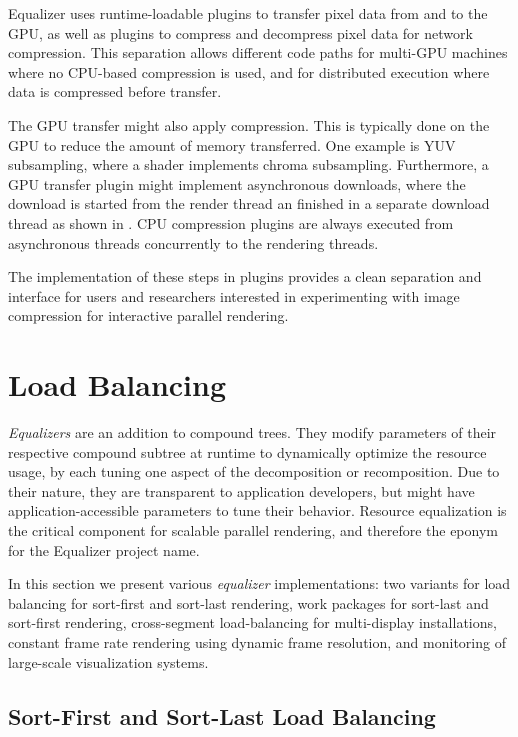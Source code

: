 Equalizer uses runtime-loadable plugins to transfer pixel data from and to the
GPU, as well as plugins to compress and decompress pixel data for network
compression. This separation allows different code paths for multi-GPU machines
where no CPU-based compression is used, and for distributed execution where data
is compressed before transfer.

The GPU transfer might also apply compression. This is typically done on the GPU
to reduce the amount of memory transferred. One example is YUV subsampling,
where a shader implements chroma subsampling. Furthermore, a GPU transfer plugin
might implement asynchronous downloads, where the download is started from the
render thread an finished in a separate download thread as shown in
. CPU compression plugins are always executed from asynchronous
threads concurrently to the rendering threads.

The implementation of these steps in plugins provides a clean separation and
interface for users and researchers interested in experimenting with image
compression for interactive parallel rendering.


\chapter{Load Balancing}\label{sLoadBalancing}

{\em Equalizers} are an addition to compound trees. They modify parameters of
their respective compound subtree at runtime to dynamically optimize the
resource usage, by each tuning one aspect of the decomposition or recomposition.
Due to their nature, they are transparent to application developers, but might
have application-accessible parameters to tune their behavior. Resource
equalization is the critical component for scalable parallel rendering, and
therefore the eponym for the \textsf{Equalizer} project name.

In this section we present various {\em equalizer} implementations: two
variants for load balancing for sort-first and sort-last rendering, work
packages for sort-last and sort-first rendering, cross-segment load-balancing
for multi-display installations, constant frame rate rendering using dynamic
frame resolution, and monitoring of large-scale visualization systems.

\section{Sort-First and Sort-Last Load Balancing}

